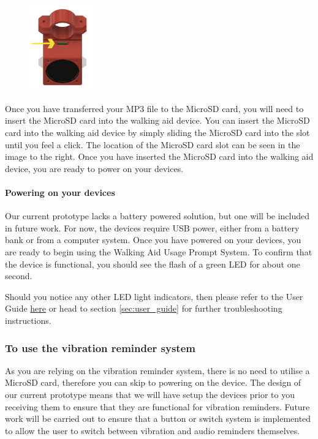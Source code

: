 				\begin{figure}
					\vspace{-3.5em}
					\centering
					\includegraphics[width=0.25\textwidth]{graphics/sd_arrow.png}
				\end{figure}

				Once you have transferred your MP3 file to the MicroSD card, you will need to insert the MicroSD card into the walking aid device. You can insert the MicroSD card into the walking aid device by simply sliding the MicroSD card into the slot until you feel a click. The location of the MicroSD card slot can be seen in the image to the right. Once you have inserted the MicroSD card into the walking aid device, you are ready to power on your devices.

				\paragraph{Powering on your devices}\mbox{}

				Our current prototype lacks a battery powered solution, but one will be included in future work. For now, the devices require USB power, either from a battery bank or from a computer system. Once you have powered on your devices, you are ready to begin using the Walking Aid Usage Prompt System. To confirm that the device is functional, you should see the flash of a green LED for about one second.

				Should you notice any other LED light indicators, then please refer to the User Guide \hyperref[sec:user_guide]{here} or head to section \ref{sec:user_guide} for further troubleshooting instructions.

				\subsubsection{To use the vibration reminder system}

				As you are relying on the vibration reminder system, there is no need to utilise a MicroSD card, therefore you can skip to powering on the device. The design of our current prototype means that we will have setup the devices prior to you receiving them to ensure that they are functional for vibration reminders. Future work will be carried out to ensure that a button or switch system is implemented to allow the user to switch between vibration and audio reminders themselves.

